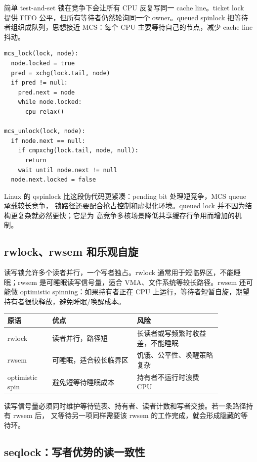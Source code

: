 简单 test-and-set 锁在竞争下会让所有 CPU 反复写同一 cache line。ticket lock 提供 FIFO 公平，但所有等待者仍然轮询同一个 owner。queued spinlock 把等待者组织成队列，思想接近 MCS：每个 CPU 主要等待自己的节点，减少 cache line 抖动。

\begin{lstlisting}
mcs_lock(lock, node):
  node.locked = true
  pred = xchg(lock.tail, node)
  if pred != null:
    pred.next = node
    while node.locked:
      cpu_relax()

mcs_unlock(lock, node):
  if node.next == null:
    if cmpxchg(lock.tail, node, null):
      return
    wait until node.next != null
  node.next.locked = false
\end{lstlisting}

Linux 的 qspinlock 比这段伪代码更紧凑：pending bit 处理短竞争，MCS queue 承载较长竞争，
锁路径还要配合抢占控制和虚拟化环境。queued lock 并不因为结构更复杂就必然更快；它是为
高竞争多核场景降低共享缓存行争用而增加的机制。

\subsection{rwlock、rwsem 和乐观自旋}

读写锁允许多个读者并行，一个写者独占。rwlock 通常用于短临界区，不能睡眠；rwsem 是可睡眠读写信号量，适合 VMA、文件系统等较长路径。rwsem 还可能做 optimistic spinning：如果持有者正在 CPU 上运行，等待者短暂自旋，期望持有者很快释放，避免睡眠/唤醒成本。

\begin{longtable}{p{0.18\linewidth}p{0.34\linewidth}p{0.34\linewidth}}
\toprule
原语 & 优点 & 风险 \\
\midrule
rwlock & 读者并行，路径短 & 长读者或写频繁时收益差，不能睡眠 \\
rwsem & 可睡眠，适合较长临界区 & 饥饿、公平性、唤醒策略复杂 \\
optimistic spin & 避免短等待睡眠成本 & 持有者不运行时浪费 CPU \\
\bottomrule
\end{longtable}

读写信号量必须同时维护等待链表、持有者、读者计数和写者交接。若一条路径持有 rwsem 后，
又等待另一项同样需要该 rwsem 的工作完成，就会形成隐藏的等待环。

\subsection{seqlock：写者优势的读一致性}

